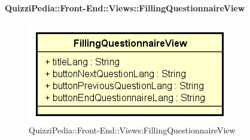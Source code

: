 \paragraph{QuizziPedia::Front-End::Views::FillingQuestionnaireView}
\begin{figure} [ht]
	\centering
	\includegraphics[scale=0.80]{UML/Classi/Front-End/QuizziPedia_Front-end_FillingQuestionnaireView.png}
	\caption{QuizziPedia::Front-End::Views:FillingQuestionnaireView}
\end{figure} \FloatBarrier
